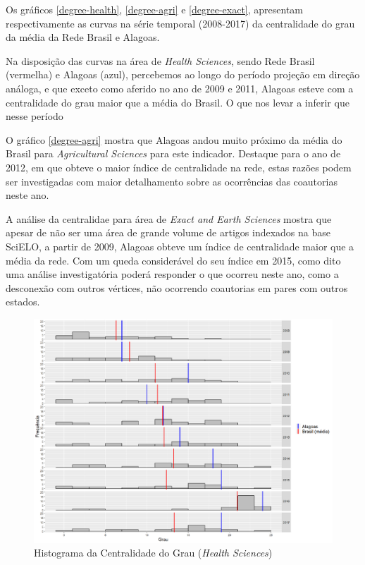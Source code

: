 Os gráficos \ref{degree-health}, \ref{degree-agri} e \ref{degree-exact}, apresentam respectivamente as curvas na série temporal (2008-2017) da centralidade do grau da média da Rede Brasil e Alagoas. 

Na disposição das curvas na área de \textit{Health Sciences}, sendo Rede Brasil (vermelha) e Alagoas (azul), percebemos ao longo do período projeção em direção análoga, e que exceto como aferido no ano de 2009 e 2011, Alagoas esteve com a centralidade do grau maior que a média do Brasil. O que nos levar a inferir que nesse período

O gráfico \ref{degree-agri} mostra que Alagoas andou muito próximo da média do Brasil para \textit{Agricultural Sciences} para este indicador. Destaque para o ano de 2012, em que obteve o maior índice de centralidade na rede, estas razões podem ser investigadas com maior detalhamento sobre as ocorrências das coautorias neste ano.

A análise da centralidae para área de \textit{Exact and Earth Sciences} mostra que apesar de não ser uma área de grande volume de artigos indexados na base SciELO, a partir de 2009, Alagoas obteve um índice de centralidade maior que a média da rede. Com um queda considerável do seu índice em 2015, como dito uma análise investigatória poderá responder o que ocorreu neste ano, como a desconexão com outros vértices, não ocorrendo coautorias em pares com outros estados.


\begin{figure}[H]
	\centering
	\includegraphics[scale=0.5]{Imagens/degree-hist.pdf}
	\caption{Histograma da Centralidade do Grau (\textit{Health Sciences})}
	\label{degree-health-hist}
\end{figure}

